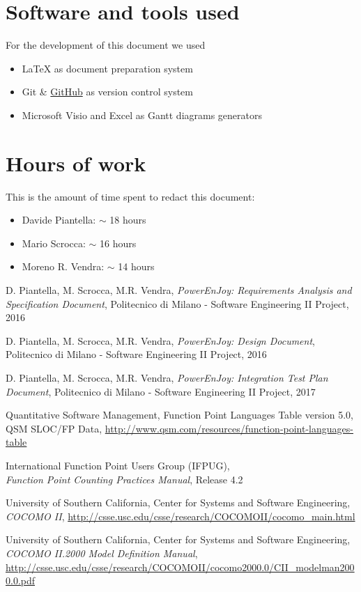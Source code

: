 \begin{appendices}

	\section{Software and tools used}
	For the development of this document we used
	\begin{itemize}
		\item \LaTeX{} as document preparation system
		\item Git \& \href{http://github.com}{GitHub} as version control system
		\item Microsoft Visio and Excel as Gantt diagrams generators
	\end{itemize}
	
	\section{Hours of work}
	This is the amount of time spent to redact this document:
	\begin{itemize}
		\item Davide Piantella: $\sim$ 18 hours
		\item Mario Scrocca: $\sim$ 16 hours
		\item Moreno R. Vendra: $\sim$ 14 hours
	\end{itemize}
	
\end{appendices}


\begin{thebibliography}{9}

D. Piantella, M. Scrocca, M.R. Vendra, \emph{PowerEnJoy: Requirements Analysis and Specification Document}, Politecnico di Milano - Software Engineering II Project, 2016

D. Piantella, M. Scrocca, M.R. Vendra, \emph{PowerEnJoy: Design Document}, Politecnico di Milano - Software Engineering II Project, 2016

D. Piantella, M. Scrocca, M.R. Vendra, \emph{PowerEnJoy: Integration Test Plan Document}, Politecnico di Milano - Software Engineering II Project, 2017

Quantitative Software Management, Function Point Languages Table version 5.0, QSM SLOC/FP Data, \url{http://www.qsm.com/resources/function-point-languages-table}

International Function Point Users Group (IFPUG),
\\\emph{Function Point Counting Practices Manual}, Release 4.2 

University of Southern California, Center for Systems and Software Engineering, \emph{COCOMO II}, \url{http://csse.usc.edu/csse/research/COCOMOII/cocomo_main.html}

University of Southern California, Center for Systems and Software Engineering, \emph{COCOMO II.2000 Model Definition Manual}, \url{http://csse.usc.edu/csse/research/COCOMOII/cocomo2000.0/CII_modelman2000.0.pdf}

\end{thebibliography}